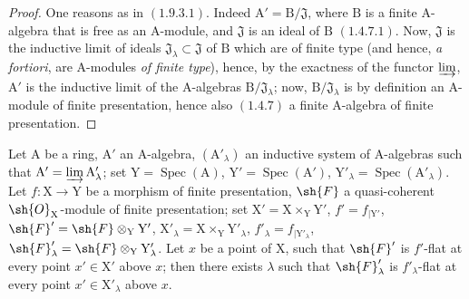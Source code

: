\begin{proof}
One reasons as in $(1.9.3.1)$. Indeed $\mathrm{A}'=\mathrm{B}/\mathfrak{J}$, where $\mathrm{B}$ is a finite $\mathrm{A}$-algebra
that is free as an $\mathrm{A}$-module, and $\mathfrak{J}$ is an ideal of $\mathrm{B}$ $(1.4.7.1)$. Now, $\mathfrak{J}$ is the inductive
limit of ideals $\mathfrak{J}_\lambda\subset\mathfrak{J}$ of $\mathrm{B}$ which are of finite type (and hence, \emph{a fortiori}, are $\mathrm{A}$-modules \emph{of finite type}),
hence,
by the exactness of the functor $\varinjlim$, $\mathrm{A}'$ is the inductive limit of the $\mathrm{A}$-algebras $\mathrm{B}/\mathfrak{J}_\lambda$; now, $\mathrm{B}/\mathfrak{J}_\lambda$
is by definition an $\mathrm{A}$-module of finite presentation, hence also $(1.4.7)$ a finite $\mathrm{A}$-algebra
of finite presentation.
\end{proof}

\begin{lemma}[11.5.5.2]
\label{IV.11.5.5.2}
Let $\mathrm{A}$ be a ring, $\mathrm{A}'$ an $\mathrm{A}$-algebra, $(\mathrm{A}'_\lambda)$ an inductive system
of $\mathrm{A}$-algebras such that $\mathrm{A}'=\varinjlim\mathrm{A}'_\lambda$; set $\mathrm{Y}=\operatorname{Spec}(\mathrm{A})$, $\mathrm{Y}'=\operatorname{Spec}(\mathrm{A}')$, $\mathrm{Y}'_\lambda=\operatorname{Spec}(\mathrm{A}'_\lambda)$.
Let $f:\mathrm{X}\to\mathrm{Y}$ be a morphism of finite presentation, $\sh{F}$ a quasi-coherent $\sh{O}_\mathrm{X}$-module of finite
presentation; set $\mathrm{X}'=\mathrm{X}\times_\mathrm{Y}\mathrm{Y}'$, $f'=f_{|\mathrm{Y}'}$, $\sh{F}'=\sh{F}\otimes_\mathrm{Y}\mathrm{Y}'$, $\mathrm{X}'_\lambda=\mathrm{X}\times_\mathrm{Y}\mathrm{Y}'_\lambda$, $f'_\lambda=f_{|\mathrm{Y}'_\lambda}$,
$\sh{F}'_\lambda=\sh{F}\otimes_\mathrm{Y}\mathrm{Y}'_\lambda$. Let $x$ be a point of $\mathrm{X}$, such that $\sh{F}'$ is $f'$-flat at every point $x'\in\mathrm{X}'$ above $x$;
then there exists $\lambda$ such that $\sh{F}'_\lambda$ is $f'_\lambda$-flat at every point $x'\in\mathrm{X}'_\lambda$ above $x$.
\end{lemma}

